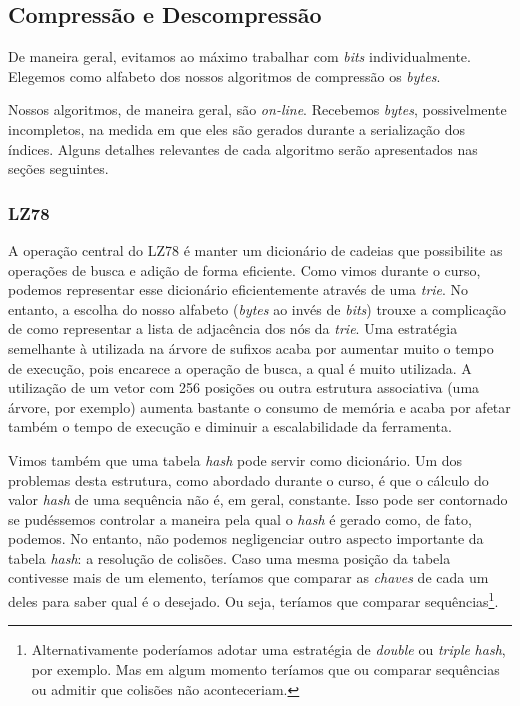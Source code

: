 \documentclass[]{article}
\begin{document}
\subsection{Compressão e Descompressão}

De maneira geral, evitamos ao máximo trabalhar com \textit{bits} individualmente. Elegemos como alfabeto dos nossos algoritmos de compressão os \textit{bytes}.

Nossos algoritmos, de maneira geral, são \textit{on-line}. Recebemos \textit{bytes}, possivelmente incompletos, na medida em que eles são gerados durante a serialização dos índices. Alguns detalhes relevantes de cada algoritmo serão apresentados nas seções seguintes.

\subsubsection{LZ78}

A operação central do LZ78 é manter um dicionário de cadeias que possibilite as operações de busca e adição de forma eficiente. Como vimos durante o curso, podemos representar esse dicionário eficientemente através de uma \textit{trie}. No entanto, a escolha do nosso alfabeto (\textit{bytes} ao invés de \textit{bits}) trouxe a complicação de como representar a lista de adjacência dos nós da \textit{trie}. Uma estratégia semelhante à utilizada na árvore de sufixos acaba por aumentar muito o tempo de execução, pois encarece a operação de busca, a qual é muito utilizada. A utilização de um vetor com 256 posições ou outra estrutura associativa (uma árvore, por exemplo) aumenta bastante o consumo de memória e acaba por afetar também o tempo de execução e diminuir a escalabilidade da ferramenta.

Vimos também que uma tabela \textit{hash} pode servir como dicionário. Um dos problemas desta estrutura, como abordado durante o curso, é que o cálculo do valor \textit{hash} de uma sequência não é, em geral, constante. Isso pode ser contornado se pudéssemos controlar a maneira pela qual o \textit{hash} é gerado como, de fato, podemos. No entanto, não podemos negligenciar outro aspecto importante da tabela \textit{hash}: a resolução de colisões. Caso uma mesma posição da tabela contivesse mais de um elemento, teríamos que comparar as \textit{chaves} de cada um deles para saber qual é o desejado. Ou seja, teríamos que comparar sequências\footnote{Alternativamente poderíamos adotar uma estratégia de \textit{double} ou \textit{triple} \textit{hash}, por exemplo. Mas em algum momento teríamos que ou comparar sequências ou admitir que colisões não aconteceriam.}.
\end{document}
